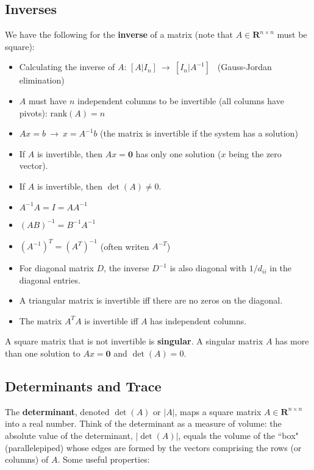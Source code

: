 \documentclass[11pt]{article}
\theoremstyle{plain}
\theoremstyle{definition}
\theoremstyle{remark}
\numberwithin{equation}{section}
\begin{document}
\subsection{Inverses}

We have the following for the {\bf inverse} of a matrix (note that $A \in \mathbf{R}^{n \times n}$ must be square):
\begin{itemize}[noitemsep]
\item Calculating the inverse of $A$: $[A | I_n] \ \rightarrow \ [I_n | A^{-1} ]$ \ (Gauss-Jordan elimination)
\item $A$ must have $n$ independent columns to be invertible (all columns have pivots): $\text{rank}(A) = n$
\item $Ax = b \ \rightarrow \ x = A^{-1} b$ \quad (the matrix is invertible if the system has a solution)
\item If $A$ is invertible, then $A x = \mathbf{0}$ has only one solution ($x$ being the zero vector).
\item If $A$ is invertible, then $\det(A) \neq 0$.
\item $A^{-1} A = I = A A^{-1}$
\item $(AB)^{-1} = B^{-1} A^{-1}$
\item $(A^{-1})^T = (A^T)^{-1}$ \quad (often writen $A^{-T}$)
\item For diagonal matrix $D$, the inverse $D^{-1}$ is also diagonal with $1/d_{ii}$ in the diagonal entries.
\item A triangular matrix is invertible iff there are no zeros on the diagonal.
\item The matrix $A^T A$ is invertible iff $A$ has independent columns.
\end{itemize}

A square matrix that is not invertible is {\bf singular}. A singular matrix $A$ has more than one solution to $A x = \mathbf{0}$ and $\det(A) = 0$.


\subsection{Determinants and Trace}

The {\bf determinant}, denoted $\det(A)$ or $|A|$, maps a square matrix $A \in \mathbf{R}^{n \times n}$ into a real number. Think of the determinant as a measure of volume: the absolute value of the determinant, $|\det(A)|$, equals the volume of the ``box" (parallelepiped) whose edges are formed by the vectors comprising the rows (or columns) of $A$. Some useful properties:
\end{document}
